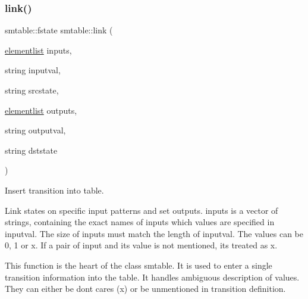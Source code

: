 \subsubsection{\texorpdfstring{link()}{link()}}
{\footnotesize\ttfamily smtable\+::fstate smtable\+::link (\begin{DoxyParamCaption}\item[{\mbox{\hyperlink{classsmtable_a5eb5f5f14b1e52a2bde73255ea71927f}{elementlist}}}]{inputs,  }\item[{string}]{inputval,  }\item[{string}]{srcstate,  }\item[{\mbox{\hyperlink{classsmtable_a5eb5f5f14b1e52a2bde73255ea71927f}{elementlist}}}]{outputs,  }\item[{string}]{outputval,  }\item[{string}]{dststate }\end{DoxyParamCaption})}



Insert transition into table. 

Link states on specific input patterns and set outputs. inputs is a vector of strings, containing the exact names of inputs which values are specified in inputval. The size of inputs must match the length of inputval. The values can be \textquotesingle{}0\textquotesingle{}, \textquotesingle{}1\textquotesingle{} or \textquotesingle{}x\textquotesingle{}. If a pair of input and its value is not mentioned, its treated as \textquotesingle{}x\textquotesingle{}.

This function is the heart of the class smtable. It is used to enter a single transition information into the table. It handles ambiguous description of values. They can either be don\textquotesingle{}t cares (\textquotesingle{}x\textquotesingle{}) or be unmentioned in transition definition.


